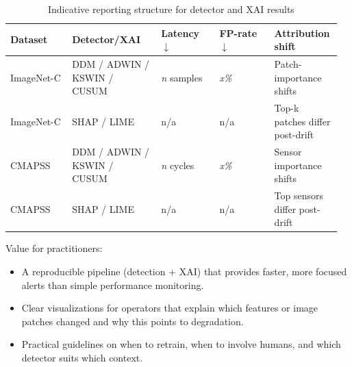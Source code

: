 \begin{table}[h]
  \centering
  \caption{Indicative reporting structure for detector and XAI results}
  \small
  \setlength{\tabcolsep}{4pt}
  \begin{tabular}{p{0.18\linewidth} p{0.26\linewidth} p{0.17\linewidth} p{0.16\linewidth} p{0.19\linewidth}}
      \hline
        \textbf{Dataset} & \textbf{Detector/XAI} & \textbf{Latency $\downarrow$} & \textbf{FP-rate $\downarrow$} & \textbf{Attribution shift} \\
      \hline
      ImageNet-C & DDM / ADWIN / KSWIN / CUSUM & \textit{n} samples & \textit{x\%} & Patch-importance shifts \\
      ImageNet-C & SHAP / LIME & n/a & n/a & Top-k patches differ post-drift \\
      CMAPSS & DDM / ADWIN / KSWIN / CUSUM & \textit{n} cycles & \textit{x\%} & Sensor importance shifts \\
      CMAPSS & SHAP / LIME & n/a & n/a & Top sensors differ post-drift \\
      \hline
    \end{tabular}
\end{table}

Value for practitioners:
\begin{itemize}
  \item A reproducible pipeline (detection + XAI) that provides faster, more focused alerts than simple performance monitoring.
  \item Clear visualizations for operators that explain which features or image patches changed and why this points to degradation.
  \item Practical guidelines on when to retrain, when to involve humans, and which detector suits which context.
\end{itemize}

